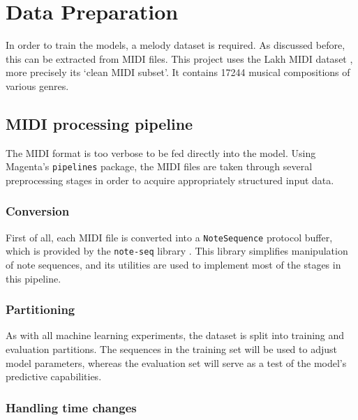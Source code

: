 \documentclass[../../report.tex]{subfiles}
\begin{document}
\section{Data Preparation}

In order to train the models, a melody dataset is required. As discussed before,
this can be extracted from MIDI files. This project uses the Lakh MIDI dataset
\cite{Raffel2016}, more precisely its `clean MIDI subset'. It contains
\num{17244} musical compositions of various genres.

\subsection{MIDI processing pipeline}

The MIDI format is too verbose to be fed directly into the model. Using
Magenta's \texttt{pipelines} package, the MIDI files are taken through several
preprocessing stages in order to acquire appropriately structured input data.


\subsubsection{Conversion}

First of all, each MIDI file is converted into a \texttt{NoteSequence} protocol
buffer\footnotemark{}, which is provided by the \texttt{note-seq} library
\cite{NoteSeq}. This library simplifies manipulation of note sequences, and its
utilities are used to implement most of the stages in this pipeline.


\subsubsection{Partitioning}

As with all machine learning experiments, the dataset is split into training and
evaluation partitions. The sequences in the training set will be used to adjust
model parameters, whereas the evaluation set will serve as a test of the model's
predictive capabilities.

\subsubsection{Handling time changes}
\end{document}
